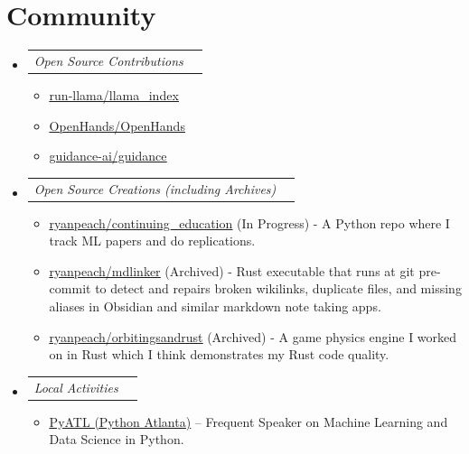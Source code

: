 \documentclass[letterpaper,11pt]{article}
\makeatletter
\newcommand{\resumeItem}[1]{
  \item\small{
    {#1 \vspace{-2pt}}
  }
}
\newcommand{\resumeSubSubheading}[2]{
    \item
    \begin{tabular*}{0.97\textwidth}{l@{\extracolsep{\fill}}r}
      \textit{\small#1} & \textit{\small #2} \\
    \end{tabular*}\vspace{-7pt}
}
\newcommand{\resumeSubHeadingListStart}{\begin{itemize}[leftmargin=0.15in, label={}]}
\newcommand{\resumeSubHeadingListEnd}{\end{itemize}}
\newcommand{\resumeItemListStart}{\begin{itemize}}
\newcommand{\resumeItemListEnd}{\end{itemize}\vspace{-5pt}}
\makeatother
\begin{document}
 \section{Community}
   \resumeSubHeadingListStart
   \resumeSubSubheading
   {Open Source Contributions}{}
   \resumeItemListStart
      \resumeItem{\href{https://github.com/run-llama/llama_index/issues?q=is\%3Apr\%20author\%3A\%40me}{\underline{run-llama/llama\_index}}}
      \resumeItem{\href{https://github.com/OpenHands/OpenHands/issues?q=is\%3Apr\%20author\%3A\%40me}{\underline{OpenHands/OpenHands}}}
      \resumeItem{\href{https://github.com/guidance-ai/guidance/issues?q=is\%3Apr\%20author\%3A\%40me}{\underline{guidance-ai/guidance}}}
   \resumeItemListEnd
   \resumeSubSubheading
   {Open Source Creations (including Archives)}{}
   \resumeItemListStart
   \resumeItem{\href{https://github.com/ryanpeach/continuing_education}{\underline{ryanpeach/continuing\_education}} (In Progress) - A Python repo where I track ML papers and do replications.}
   \resumeItem{\href{https://github.com/ryanpeach/mdlinker}{\underline{ryanpeach/mdlinker}} (Archived) - Rust executable that runs at git pre-commit to detect and repairs broken wikilinks, duplicate files, and missing aliases in Obsidian and similar markdown note taking apps.}
   \resumeItem{\href{https://github.com/ryanpeach/orbitingsandrust}{\underline{ryanpeach/orbitingsandrust}} (Archived) - A game physics engine I worked on in Rust which I think demonstrates my Rust code quality.}
   \resumeItemListEnd
   \resumeSubSubheading
   {Local Activities}{}
   \resumeItemListStart
     \resumeItem{\href{https://www.meetup.com/python-atlanta/}{\underline{PyATL
           (Python Atlanta)}} -- Frequent Speaker on Machine Learning and Data Science in Python.}
   \resumeItemListEnd
   \resumeSubHeadingListEnd

\end{document}
